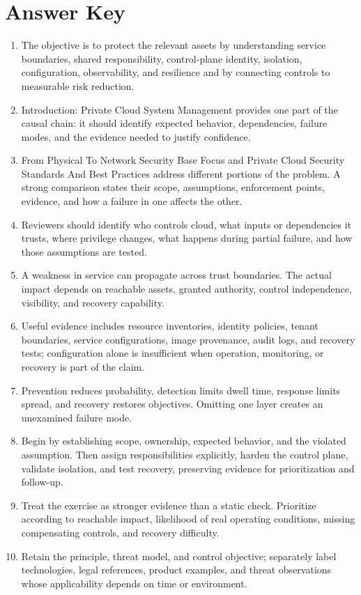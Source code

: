 \documentclass[11pt]{article}
\begin{document}
\section*{Answer Key}
\begin{enumerate}
\item The objective is to protect the relevant assets by understanding service boundaries, shared responsibility, control-plane identity, isolation, configuration, observability, and resilience and by connecting controls to measurable risk reduction.
\item Introduction: Private Cloud System Management provides one part of the causal chain: it should identify expected behavior, dependencies, failure modes, and the evidence needed to justify confidence.
\item From Physical To Network Security Base Focus and Private Cloud Security Standards And Best Practices address different portions of the problem. A strong comparison states their scope, assumptions, enforcement points, evidence, and how a failure in one affects the other.
\item Reviewers should identify who controls cloud, what inputs or dependencies it trusts, where privilege changes, what happens during partial failure, and how those assumptions are tested.
\item A weakness in service can propagate across trust boundaries. The actual impact depends on reachable assets, granted authority, control independence, visibility, and recovery capability.
\item Useful evidence includes resource inventories, identity policies, tenant boundaries, service configurations, image provenance, audit logs, and recovery tests; configuration alone is insufficient when operation, monitoring, or recovery is part of the claim.
\item Prevention reduces probability, detection limits dwell time, response limits spread, and recovery restores objectives. Omitting one layer creates an unexamined failure mode.
\item Begin by establishing scope, ownership, expected behavior, and the violated assumption. Then assign responsibilities explicitly, harden the control plane, validate isolation, and test recovery, preserving evidence for prioritization and follow-up.
\item Treat the exercise as stronger evidence than a static check. Prioritize according to reachable impact, likelihood of real operating conditions, missing compensating controls, and recovery difficulty.
\item Retain the principle, threat model, and control objective; separately label technologies, legal references, product examples, and threat observations whose applicability depends on time or environment.
\end{enumerate}
\end{document}
